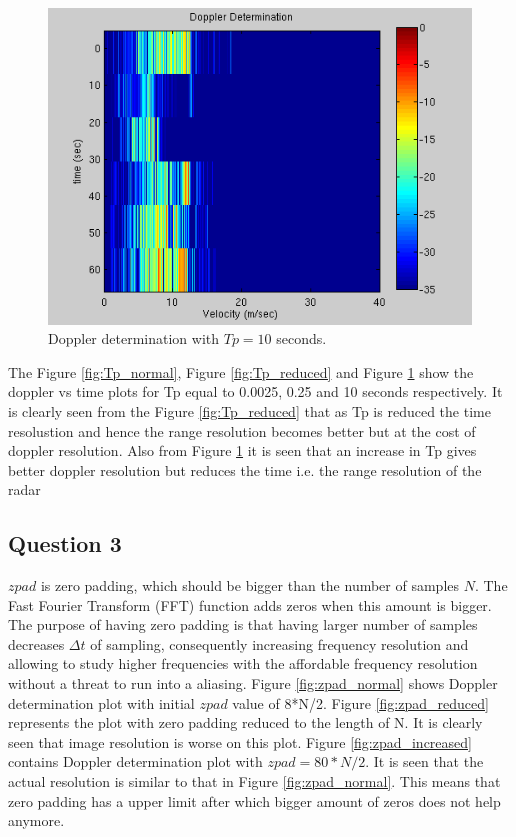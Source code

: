 \documentclass{article}
\begin{document}
\begin{figure}[ht]
\begin{minipage}[b]{0.33\linewidth}
\includegraphics[width=\textwidth]{Figures/Tp_increased.png}
\caption{Doppler determination with $Tp = 10$ seconds.}
\label{fig:Tp_increased}
\end{minipage}
\end{figure}

The Figure \ref{fig:Tp_normal}, Figure \ref{fig:Tp_reduced} and Figure \ref{fig:Tp_increased} show the doppler vs time plots for Tp equal to 0.0025, 0.25 and 10 seconds respectively. It is clearly seen from the Figure \ref{fig:Tp_reduced} that as Tp is reduced the time resolustion and hence the range resolution becomes better but at the cost of doppler resolution. Also from Figure \ref{fig:Tp_increased} it is seen that an increase in Tp gives better doppler resolution but reduces the time i.e. the range resolution of the radar

\subsection{Question 3}

$zpad$ is zero padding, which should be bigger than the number of samples $N$. The Fast Fourier Transform (FFT) function adds zeros when this amount is bigger. The purpose of having zero padding is that having larger number of samples decreases $\Delta t$ of sampling, consequently increasing frequency resolution and allowing to study higher frequencies with the affordable frequency resolution without a threat to run into a aliasing. Figure \ref{fig:zpad_normal} shows Doppler determination plot with initial $zpad$ value of 8*N/2. Figure \ref{fig:zpad_reduced} represents the plot with zero padding reduced to the length of N. It is clearly seen that image resolution is worse on this plot. Figure \ref{fig:zpad_increased} contains Doppler determination plot with $zpad = 80*N/2$. It is seen that the actual resolution is similar to that in Figure \ref{fig:zpad_normal}. This means that zero padding has a upper limit after which bigger amount of zeros does not help anymore.
\end{document}
